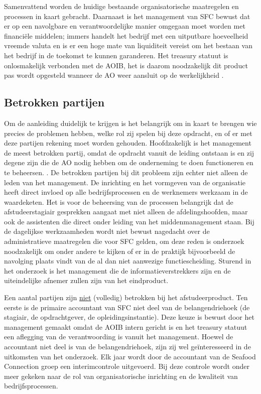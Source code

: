 Samenvattend worden de huidige bestaande organisatorische maatregelen en processen in kaart gebracht. Daarnaast is het management van SFC bewust dat er op een navolgbare en verantwoordelijke manier omgegaan moet worden met financiële middelen; immers handelt het bedrijf met een uitputbare hoeveelheid vreemde valuta en is er een hoge mate van liquiditeit vereist om het bestaan van het bedrijf in de toekomst te kunnen garanderen. Het treasury statuut is onlosmakelijk verbonden met de AOIB, het is daarom noodzakelijk dit product pas wordt opgesteld wanneer de AO weer aansluit op de werkelijkheid \citep{watisonderzoek,buunk,financiering}.

\subsection{Betrokken partijen}
Om de aanleiding duidelijk te krijgen is het belangrijk om in kaart te brengen wie precies de problemen hebben, welke rol zij spelen bij deze opdracht, en of er met deze partijen rekening moet worden gehouden. Hoofdzakelijk is het management de meest betrokken partij, omdat de opdracht vanuit de leiding ontstaan is en zij degene zijn die de AO nodig hebben om de onderneming te doen functioneren en te beheersen. \citep{bivperspectief}. De betrokken partijen bij dit probleem zijn echter niet alleen de leden van het management. De inrichting en het vormgeven van de organisatie heeft direct invloed op alle bedrijfsprocessen en de werknemers werkzaam in de waardeketen. Het is voor de beheersing van de processen belangrijk dat de afstudeerstagiair gesprekken aangaat met niet alleen de afdelingshoofden, maar ook de assistenten die direct onder leiding van het middenmanagement staan. Bij de dagelijkse werkzaamheden wordt niet bewust nagedacht over de administratieve maatregelen die voor SFC gelden, om deze reden is onderzoek noodzakelijk om onder andere te kijken of er in de praktijk bijvoorbeeld de navolging plaats vindt van de al dan niet aanwezige functiescheiding. Sturend in het onderzoek is het management die de informatieverstrekkers zijn en de uiteindelijke afnemer zullen zijn van het eindproduct. 

Een aantal partijen zijn \underline{niet} (volledig) betrokken bij het afstudeerproduct. Ten eerste is de primaire accountant van SFC niet deel van de belangendriehoek (de stagiair, de opdrachtgever, de opleidingsinstantie). Deze keuze is bewust door het management gemaakt omdat de AOIB intern gericht is en het treasury statuut een aflegging van de verantwoording is vanuit het management. Hoewel de accountant niet deel is van de belangendriehoek, zijn zij wel geïnteresseerd in de uitkomsten van het onderzoek. Elk jaar wordt door de accountant van de Seafood Connection groep een interimcontrole uitgevoerd. Bij deze controle wordt onder meer gekeken naar de rol van organisatorische inrichting en de kwaliteit van bedrijfsprocessen. \citep{jaarrapport2017}

